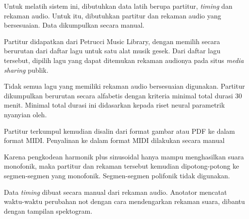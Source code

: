 Untuk melatih sistem ini, dibutuhkan data latih berupa partitur, \textit{timing} dan rekaman audio. Untuk itu, dibutuhkan partitur dan rekaman audio yang bersesuaian. Data dikumpulkan secara manual.

Partitur didapatkan dari Petrucci Music Library, dengan memilih secara berurutan dari daftar lagu untuk satu alat musik gesek. Dari daftar lagu tersebut, dipilih lagu yang dapat ditemukan rekaman audionya pada situs \textit{media sharing} publik.

Tidak semua lagu yang memiliki rekaman audio bersesuaian digunakan. Partitur dikumpulkan berurutan secara alfabetis dengan kriteria minimal total durasi 30 menit. Minimal total durasi ini didasarkan kepada riset neural parametrik nyanyian oleh.

Partitur terkumpul kemudian disalin dari format gambar atau PDF ke dalam format MIDI. Penyalinan ke dalam format MIDI dilakukan secara manual

Karena pengkodean harmonik plus sinusoidal hanya mampu menghasilkan suara monofonik, maka partitur dan rekaman tersebut kemudian dipotong-potong ke segmen-segmen yang monofonik. Segmen-segmen polifonik tidak digunakan.

Data \textit{timing} dibuat secara manual dari rekaman audio. Anotator mencatat waktu-waktu perubahan not dengan cara mendengarkan rekaman suara, dibantu dengan tampilan spektogram.

